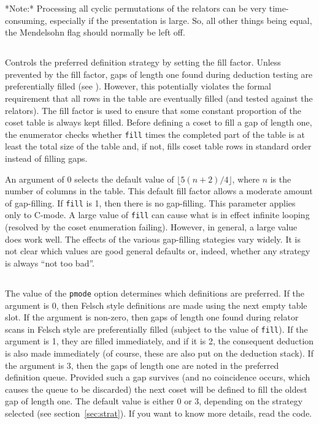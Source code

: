 *Note:* Processing all cyclic permutations of the relators can be very
time-consuming, especially if the presentation is large.  So, all other
things being equal, the Mendelsohn flag should normally be left off. 

\subsection{}
\label{cmd:ffactor}
\label{cmd:fill factor}

Controls the preferred definition strategy by setting the fill factor.
Unless prevented by the fill factor,
gaps of length one found during deduction testing are
preferentially filled (see \cite{Hav}).  However, this potentially violates
the formal requirement that all rows in the table are eventually filled (and
tested against the relators).  The fill factor is used to ensure that some
constant proportion of the coset table is always kept filled.  Before
defining a coset to fill a gap of length one, the enumerator checks whether
{\tt fill} times the completed part of the table is at least the total size of
the table and, if not, fills coset table rows in standard order instead 
of filling gaps.

An argument of 0 selects the default value of $\lfloor 5(n+2)/4 \rfloor$,
where $n$ is the number of columns in the table.  
This default fill factor allows a moderate amount of gap-filling.
If {\tt fill} is 1, then there is no gap-filling.
This parameter applies only to C-mode.
A large value of {\tt fill} can cause what is in effect infinite looping
(resolved by the coset enumeration failing).
However, in general, a large value does work well.
The effects of the various gap-filling stategies vary widely.  
It is not clear which values are good general defaults or, indeed, whether
  any strategy is always ``not too bad''.

\subsection{}
\label{cmd:pd mode}
\label{cmd:pmode}
The value of the {\tt pmode} option determines which definitions
are preferred.  If the argument is 0, then Felsch style definitions are made
using the next empty table slot.  If the argument is non-zero, then gaps of
length one found during relator scans in Felsch style are preferentially
filled (subject to the value of {\tt fill}).  If the argument is 1, they are
filled immediately, and if it is 2, the consequent deduction is also made
immediately (of course, these are also put on the deduction stack).  If the
argument is 3, then the gaps of length one
are noted in the preferred definition queue.
Provided such a gap survives (and no coincidence occurs, which causes
the queue to be discarded) the next coset will be defined to fill the oldest
gap of length one.  The default value is either 0 or 3, depending on the
strategy selected (see section~\ref{sec:strat}). If you want to
know more details, read the code.


